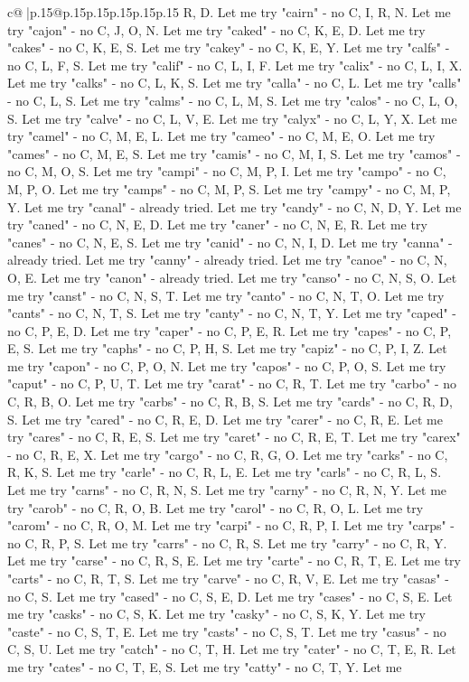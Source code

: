 \documentclass{article}
\begin{document}
{\begin{supertabular}{c@{$\;$}|p{.15\linewidth}@{}p{.15\linewidth}p{.15\linewidth}p{.15\linewidth}p{.15\linewidth}p{.15\linewidth}}
{{{R, D. Let me try "cairn" {-} no C, I, R, N. Let me try "cajon" {-} no C, J, O, N. Let me try "caked" {-} no C, K, E, D. Let me try "cakes" {-} no C, K, E, S. Let me try "cakey" {-} no C, K, E, Y. Let me try "calfs" {-} no C, L, F, S. Let me try "calif" {-} no C, L, I, F. Let me try "calix" {-} no C, L, I, X. Let me try "calks" {-} no C, L, K, S. Let me try "calla" {-} no C, L. Let me try "calls" {-} no C, L, S. Let me try "calms" {-} no C, L, M, S. Let me try "calos" {-} no C, L, O, S. Let me try "calve" {-} no C, L, V, E. Let me try "calyx" {-} no C, L, Y, X. Let me try "camel" {-} no C, M, E, L. Let me try "cameo" {-} no C, M, E, O. Let me try "cames" {-} no C, M, E, S. Let me try "camis" {-} no C, M, I, S. Let me try "camos" {-} no C, M, O, S. Let me try "campi" {-} no C, M, P, I. Let me try "campo" {-} no C, M, P, O. Let me try "camps" {-} no C, M, P, S. Let me try "campy" {-} no C, M, P, Y. Let me try "canal" {-} already tried. Let me try "candy" {-} no C, N, D, Y. Let me try "caned" {-} no C, N, E, D. Let me try "caner" {-} no C, N, E, R. Let me try "canes" {-} no C, N, E, S. Let me try "canid" {-} no C, N, I, D. Let me try "canna" {-} already tried. Let me try "canny" {-} already tried. Let me try "canoe" {-} no C, N, O, E. Let me try "canon" {-} already tried. Let me try "canso" {-} no C, N, S, O. Let me try "canst" {-} no C, N, S, T. Let me try "canto" {-} no C, N, T, O. Let me try "cants" {-} no C, N, T, S. Let me try "canty" {-} no C, N, T, Y. Let me try "caped" {-} no C, P, E, D. Let me try "caper" {-} no C, P, E, R. Let me try "capes" {-} no C, P, E, S. Let me try "caphs" {-} no C, P, H, S. Let me try "capiz" {-} no C, P, I, Z. Let me try "capon" {-} no C, P, O, N. Let me try "capos" {-} no C, P, O, S. Let me try "caput" {-} no C, P, U, T. Let me try "carat" {-} no C, R, T. Let me try "carbo" {-} no C, R, B, O. Let me try "carbs" {-} no C, R, B, S. Let me try "cards" {-} no C, R, D, S. Let me try "cared" {-} no C, R, E, D. Let me try "carer" {-} no C, R, E. Let me try "cares" {-} no C, R, E, S. Let me try "caret" {-} no C, R, E, T. Let me try "carex" {-} no C, R, E, X. Let me try "cargo" {-} no C, R, G, O. Let me try "carks" {-} no C, R, K, S. Let me try "carle" {-} no C, R, L, E. Let me try "carls" {-} no C, R, L, S. Let me try "carns" {-} no C, R, N, S. Let me try "carny" {-} no C, R, N, Y. Let me try "carob" {-} no C, R, O, B. Let me try "carol" {-} no C, R, O, L. Let me try "carom" {-} no C, R, O, M. Let me try "carpi" {-} no C, R, P, I. Let me try "carps" {-} no C, R, P, S. Let me try "carrs" {-} no C, R, S. Let me try "carry" {-} no C, R, Y. Let me try "carse" {-} no C, R, S, E. Let me try "carte" {-} no C, R, T, E. Let me try "carts" {-} no C, R, T, S. Let me try "carve" {-} no C, R, V, E. Let me try "casas" {-} no C, S. Let me try "cased" {-} no C, S, E, D. Let me try "cases" {-} no C, S, E. Let me try "casks" {-} no C, S, K. Let me try "casky" {-} no C, S, K, Y. Let me try "caste" {-} no C, S, T, E. Let me try "casts" {-} no C, S, T. Let me try "casus" {-} no C, S, U. Let me try "catch" {-} no C, T, H. Let me try "cater" {-} no C, T, E, R. Let me try "cates" {-} no C, T, E, S. Let me try "catty" {-} no C, T, Y. Let me }}}
\end{supertabular}}
\end{document}
